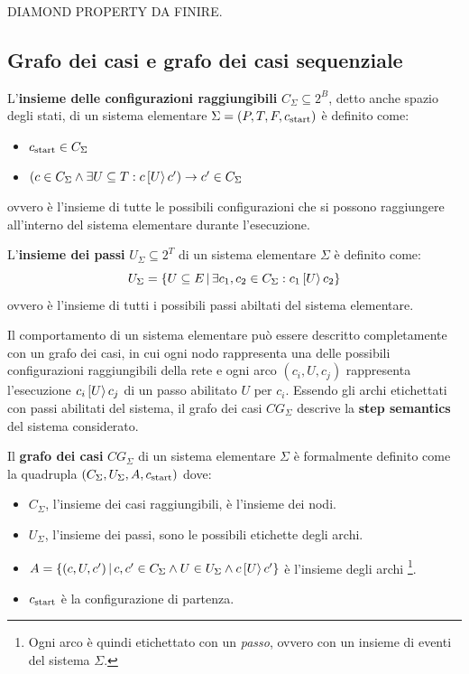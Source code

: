 \begin{defn}
    DIAMOND PROPERTY DA FINIRE.
\end{defn}

\subsection*{Grafo dei casi e grafo dei casi sequenziale}
\begin{defn}
    L'\textbf{insieme delle configurazioni raggiungibili}
    $C_{\Sigma} \subseteq 2^{B}$, detto anche spazio degli stati,
    di un sistema elementare $\Sigma = (P, T, F, c_{\textnormal{start}})$
    è definito come:
    \begin{itemize}
        \item $c_{\textnormal{start}} \in C_{\Sigma}$
        \item $\left(c \in C_{\Sigma} \land \exists U \subseteq T :
        c\,[U\rangle\,c'\right) \rightarrow c' \in C_{\Sigma}$
    \end{itemize}
    ovvero è l'insieme di tutte le possibili configurazioni che si possono
    raggiungere all'interno del sistema elementare durante l'esecuzione.
\end{defn}

\begin{defn}
    L'\textbf{insieme dei passi} $U_{\Sigma} \subseteq 2^{T}$ di un sistema
    elementare $\Sigma$ è definito come:
    \[
        U_{\Sigma} = \left\{U \subseteq E \, | \,
        \exists c_1, c_2 \in C_{\Sigma} : c_1\,[U\rangle\,c_2\right\}
    \]
    ovvero è l'insieme di tutti i possibili passi abiltati del sistema elementare.
\end{defn}

Il comportamento di un sistema elementare
può essere descritto completamente con un grafo dei casi, in cui ogni nodo
rappresenta una delle possibili configurazioni raggiungibili della rete
e ogni arco $(c_i, U, c_j)$ rappresenta l'esecuzione
$c_i\,[U\rangle\,c_j$ di un passo abilitato $U$ per $c_i$.
Essendo gli archi etichettati con passi abilitati del sistema, il grafo
dei casi $CG_{\Sigma}$ descrive la \textbf{step semantics} del sistema
considerato.

\begin{defn}
    Il \textbf{grafo dei casi} $CG_{\Sigma}$ di un sistema elementare $\Sigma$ è
    formalmente definito come la quadrupla
    $(C_{\Sigma}, U_{\Sigma}, A, c_{\textnormal{start}})$ dove:
    \begin{itemize}
        \item $C_{\Sigma}$, l'insieme dei casi raggiungibili, è l'insieme
        dei nodi.
        \item $U_{\Sigma}$, l'insieme dei passi, sono le possibili etichette
        degli archi.
        \item $A = \left\{(c, U, c') \, | \, c, c' \in C_{\Sigma} \land
        U \in U_{\Sigma} \land c\,[U\rangle\,c'\right\}$
        è l'insieme degli archi
        \footnote{Ogni arco è quindi etichettato con un \textit{passo},
        ovvero con un insieme di eventi del sistema $\Sigma$.}.
        \item $c_{\textnormal{start}}$ è la configurazione di partenza.
    \end{itemize}
\end{defn}

